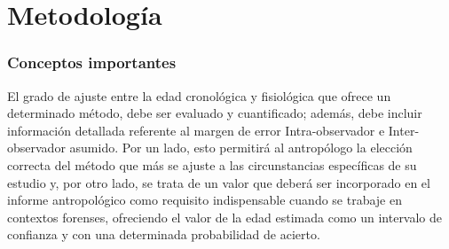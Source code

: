\documentclass[a4paper,11pt]{article}
\begin{document}
\part{Metodología}
\section{Conceptos importantes}
El grado de ajuste entre la edad cronológica y fisiológica que ofrece un determinado método, debe ser evaluado y cuantificado; además, debe incluir información detallada referente al margen de error Intra-observador e Inter-observador asumido. Por un lado, esto permitirá al antropólogo la elección correcta del método que más se ajuste a las circunstancias específicas de su estudio y, por otro lado, se trata de un valor que deberá ser incorporado en el informe antropológico como requisito indispensable cuando se trabaje en contextos forenses, ofreciendo el valor de la edad estimada como un intervalo de confianza y con una determinada probabilidad de acierto.
\end{document}

